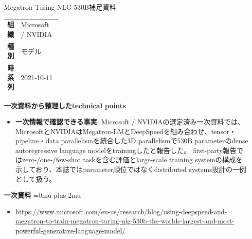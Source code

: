 \begin{technicalnote}{Megatron-Turing NLG 530B}{補足資料}
\begingroup
\begin{tabularx}{\linewidth}{@{}>{\bfseries}p{0.22\linewidth}X@{}}
組織 & Microsoft / NVIDIA \\
種別 & モデル \\
時系列 & 2021-10-11 \\
\end{tabularx}
\smallskip
{\bfseries 一次資料から整理したtechnical points}
\begin{itemize}[leftmargin=1.5em,itemsep=0.35em]
\item \textbf{一次情報で確認できる事実}: Microsoft / NVIDIAの選定済み一次資料では、MicrosoftとNVIDIAはMegatron-LMとDeepSpeedを組み合わせ、tensor・pipeline・data parallelismを統合した3D parallelismで530B parameterのdense autoregressive language modelをtrainingしたと報告した。 first-party報告ではzero-/one-/few-shot taskを含む評価とlarge-scale training systemの構成を示しており、本誌ではparameter順位ではなくdistributed systems設計の一例として扱う。
\end{itemize}
\begin{minipage}{\linewidth}
\begin{samepage}
{\bfseries 一次資料}
\begingroup\sloppy
\Urlmuskip=0mu plus 2mu\relax
\begin{itemize}[leftmargin=1.5em,itemsep=0.25em]
\item {\scriptsize\url{https://www.microsoft.com/en-us/research/blog/using-deepspeed-and-megatron-to-train-megatron-turing-nlg-530b-the-worlds-largest-and-most-powerful-generative-language-model/}}
\end{itemize}
\endgroup
\end{samepage}
\end{minipage}
\endgroup
\end{technicalnote}
\medskip

